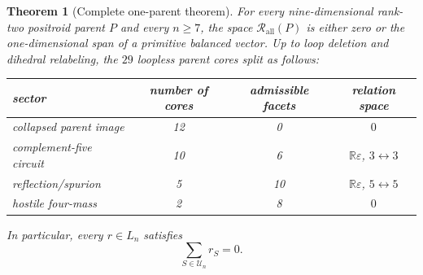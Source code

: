 \documentclass[11pt]{article}
\newtheorem{theorem}{Theorem}[section]
\newcommand{\U}{\mathcal U}
\newcommand{\R}{\mathbb R}
\newcommand{\1}{\mathbf 1}
\begin{document}
\begin{theorem}[Complete one-parent theorem]\label{thm:local}
For every nine-dimensional rank-two positroid parent $P$ and every
$n\ge7$, the space $\mathcal R_{\mathrm{all}}(P)$ is either zero or the
one-dimensional span of a primitive balanced vector.  Up to loop deletion
and dihedral relabeling, the $29$ loopless parent cores split as follows:
\begin{center}
\begin{tabular}{lccc}
\toprule
sector & number of cores & admissible facets & relation space\\
\midrule
collapsed parent image & 12 & 0 & $0$\\
complement-five circuit & 10 & 6 & $\R\varepsilon$, $3\leftrightarrow3$\\
reflection/spurion & 5 & 10 & $\R\varepsilon$, $5\leftrightarrow5$\\
hostile four-mass & 2 & 8 & $0$\\
\bottomrule
\end{tabular}
\end{center}
In particular, every $r\in L_n$ satisfies
\begin{equation}\label{eq:augmentationzero}
\sum_{S\in\U_n}r_S=0.
\end{equation}
\end{theorem}
\end{document}
